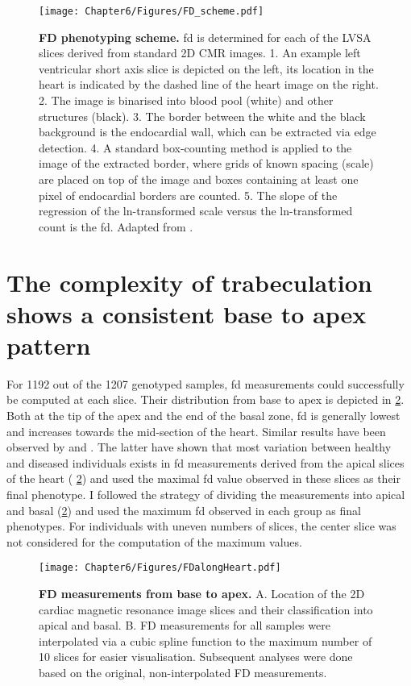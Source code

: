 \begin{figure}[hbtp]
	\centering
	\texttt{[image: Chapter6/Figures/FD\_scheme.pdf]}
	\caption[\textbf{FD phenotyping scheme. }]{\textbf{FD phenotyping scheme. }\gls{fd} is determined for each of the LVSA slices derived from standard 2D CMR images. 1. An example left ventricular short axis slice is depicted on the left, its location in the heart is indicated by the dashed line of the heart image on the right. 2. The image is binarised into blood pool (white) and other structures (black). 3. The border between the white and the black background is the endocardial wall, which can be extracted via edge detection. 4. A standard box-counting method is applied to the image of the extracted border, where grids of known spacing (scale) are placed on top of the image and boxes containing at least one pixel of endocardial borders are counted. 5. The slope of the regression of the ln-transformed scale versus the ln-transformed count is the \gls{fd}. Adapted from \citep{Captur2013}.} 
	 	\label{fig:scheme-fd}
\end{figure}

\section{The complexity of trabeculation shows a consistent base to apex pattern}
For \num{1192} out of the \num{1207} genotyped samples, \gls{fd} measurements could successfully be computed at each slice. Their distribution from base to apex is depicted in \cref{fig:perslice-fd}. Both at the tip of the apex and the end of the basal zone, \gls{fd} is generally lowest and increases towards the mid-section of the heart. Similar results have been observed by \citep{Kawel2012} and \citep{Captur2014}. The latter have shown that most variation between healthy and diseased individuals exists in \gls{fd} measurements derived from the apical slices of the heart ( \cref{fig:perslice-fd}) and used the maximal \gls{fd} value observed in these slices as their final phenotype. I followed the strategy of dividing the measurements into apical and basal (\cref{fig:perslice-fd}) and used the maximum \gls{fd} observed in each group as final phenotypes. For individuals with uneven numbers of slices, the center slice was not considered for the computation of the maximum values.
\\
\begin{figure}[hbtp]
	\centering
	\texttt{[image: Chapter6/Figures/FDalongHeart.pdf]}
	\caption[\textbf{FD measurements from base to apex. }]{\textbf{FD measurements from base to apex. } A. Location of the 2D cardiac magnetic resonance image slices and their classification into apical and basal. B. FD measurements for all samples were interpolated via a cubic spline function to the maximum number of \num{10} slices for easier visualisation. Subsequent analyses were done based on the original, non-interpolated FD measurements.} 
	 	\label{fig:perslice-fd}
\end{figure}

